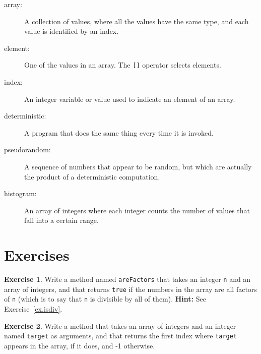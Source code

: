 \documentclass[12pt]{book}
\def\HINT{\textbf{Hint:}}
\theoremstyle{definition}
\newtheorem{excz}{Exercise}[chapter]
\newenvironment{exercise}{\bigskip\begin{excz}\mbox{}}{\end{excz}}
\begin{document}
\begin{description}

\item[array:]  A collection of values, where all the
values have the same type, and each value is identified by
an index.

\item[element:]  One of the values in an array.  The {\tt []}
operator selects elements.

\item[index:]  An integer variable or value used to indicate
an element of an array.

\item[deterministic:]  A program that does the same thing every
time it is invoked.

\item[pseudorandom:]  A sequence of numbers that appear to be
random, but which are actually the product of a deterministic
computation.

\item[histogram:]  An array of integers where each integer
counts the number of values that fall into a certain range.


\end{description}


\section{Exercises}

\begin{exercise}
Write a method named {\tt areFactors} that takes
an integer {\tt n} and an array of integers, and that returns
{\tt true} if the numbers in the array are all factors of {\tt n}
(which is to say that {\tt n} is divisible by all of them).
\HINT{} See Exercise~\ref{ex.isdiv}.
\end{exercise}


\begin{exercise}
Write a method that takes an array of integers and an integer named
{\tt target} as arguments, and that returns the first index where
{\tt target} appears in the array, if it does, and -1 otherwise.
\end{exercise}
\end{document}
